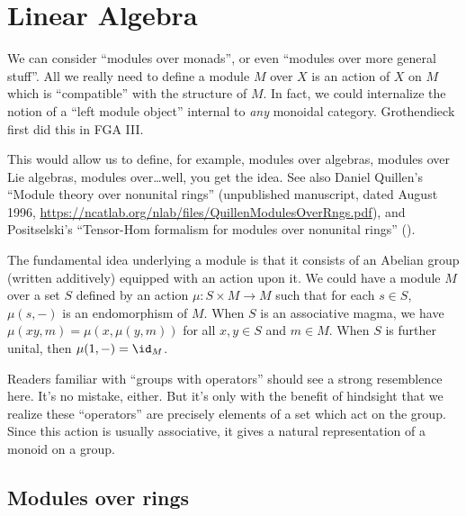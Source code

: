 
\chapter{Linear Algebra}

\begin{remark}
We can consider ``modules over monads'', or even ``modules over more
general stuff''. All we really need to define a module $M$ over $X$ is an
action of $X$ on $M$ which is ``compatible'' with the structure of
$M$. In fact, we could internalize the notion of a ``left module
object'' internal to \emph{any} monoidal category. Grothendieck first
did this in FGA III.

This would allow us to define, for example, modules over algebras,
modules over Lie algebras, modules over\dots well, you get the
idea. See also Daniel Quillen's ``Module theory over nonunital rings''
(unpublished manuscript, dated August 1996, \url{https://ncatlab.org/nlab/files/QuillenModulesOverRngs.pdf}),
and Positselski's ``Tensor-Hom formalism for modules over nonunital
rings'' ().
\end{remark}

\begin{remark}
The fundamental idea underlying a module is that it consists of an
Abelian group (written additively) equipped with an action upon it. 
We could have a module $M$ over a set $S$ defined by an action
$\mu\colon S\times M\to M$ such that for each $s\in S$, $\mu(s,-)$ is
an endomorphism of $M$. When $S$ is an associative magma,
we have $\mu(xy,m)=\mu(x,\mu(y,m))$ for all $x,y\in S$ and $m\in M$.
When $S$ is further unital, then $\mu(1,-)=\id_{M}$.

Readers familiar with ``groups with operators'' should see a strong
resemblence here. It's no mistake, either. But it's only with the
benefit of hindsight that we realize these ``operators'' are precisely
elements of a set which act on the group. Since this action is usually
associative, it gives a natural representation of a monoid on a group.
\end{remark}

\section{Modules over rings}

